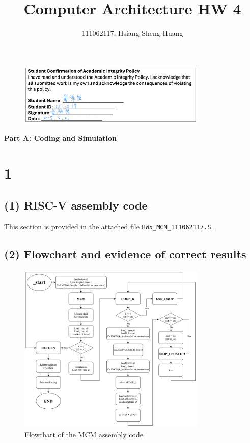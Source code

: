 \documentclass[12pt]{article}
\title{Computer Architecture HW 4}
\author{111062117, Hsiang-Sheng Huang}
\begin{document}
\maketitle

\begin{figure}[h!]
    \centering
    \includegraphics[width=0.8\textwidth]{./img/signature.png}
\end{figure}

\begin{center}
    \large \textbf{Part A: Coding and Simulation}
\end{center}

\section*{1}

\subsection*{(1) RISC-V assembly code}

This section is provided in the attached file \texttt{HW5\_MCM\_111062117.S}.

\subsection*{(2) Flowchart and evidence of correct results}

\begin{figure}[h!]
    \centering
    \includegraphics[width=0.8\textwidth]{./img/flowchart.png}
    \caption{Flowchart of the MCM assembly code}
\end{figure}
\end{document}

